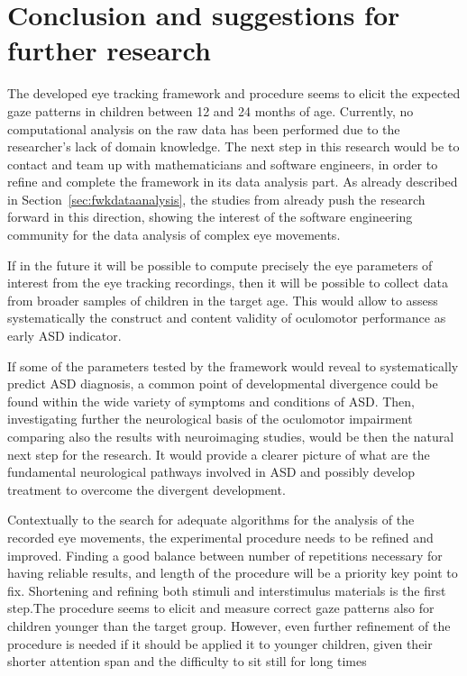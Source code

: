 \chapter{Conclusion and suggestions for further research}
\label{chap:conclusion}

The developed eye tracking framework and procedure seems to elicit the expected gaze patterns in children between 12 and 24 months of age. Currently, no computational analysis on the raw data has been performed due to the researcher’s lack of domain knowledge. The next step in this research would be to contact and team up with mathematicians and software engineers, in order to refine and complete the framework in its data analysis part. As already described in Section~\ref{sec:fwkdataanalysis}, the studies from  \cite{giordano2017eyetrackersystem,jansson2013smoothpursuit,larsson2015detection} already push the research forward in this direction, showing the interest of the software engineering community for the data analysis of complex eye movements.

If in the future it will be possible to compute precisely the eye parameters of interest from the eye tracking recordings, then it will be possible to collect data from broader samples of children in the target age. This would allow to assess systematically the construct and content validity of oculomotor performance as early ASD indicator.

If some of the parameters tested by the framework would reveal to systematically predict ASD diagnosis, a common point of developmental divergence could be found within the wide variety of symptoms and conditions of ASD. Then, investigating further the neurological basis of the oculomotor impairment comparing also the results with neuroimaging studies, would be then the natural next step for the research. It would provide a clearer picture of what are the fundamental neurological pathways involved in ASD and possibly develop treatment to overcome the divergent development. 

Contextually to the search for adequate algorithms for the analysis of the recorded eye movements, the experimental procedure needs to be refined and improved. Finding a good balance between number of repetitions necessary for having reliable results, and length of the procedure will be a priority key point to fix. Shortening and refining both stimuli and interstimulus materials is the first step.The procedure seems to elicit and measure correct gaze patterns also for children younger than the target group. However, even further refinement of the procedure is needed if it should be applied it to younger children, given their shorter attention span and the difficulty to sit still for long times

